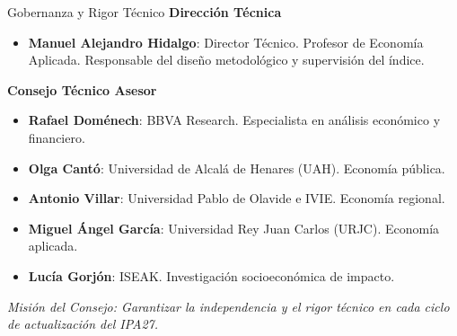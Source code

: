 \documentclass[10pt, aspectratio=169]{beamer}
\begin{document}
\begin{frame}{Gobernanza y Rigor Técnico}
    \textbf{\textcolor{brandgreen}{Dirección Técnica}}
    \begin{itemize}
        \item \textbf{Manuel Alejandro Hidalgo}: Director Técnico. Profesor de Economía Aplicada. Responsable del diseño metodológico y supervisión del índice.
    \end{itemize}
    
    \vspace{0.6cm}
    
    \textbf{\textcolor{brandgreen}{Consejo Técnico Asesor}}
    \begin{itemize}
        \small
        \item \textbf{Rafael Doménech}: BBVA Research. Especialista en análisis económico y financiero.
        \item \textbf{Olga Cantó}: Universidad de Alcalá de Henares (UAH). Economía pública.
        \item \textbf{Antonio Villar}: Universidad Pablo de Olavide e IVIE. Economía regional.
        \item \textbf{Miguel Ángel García}: Universidad Rey Juan Carlos (URJC). Economía aplicada.
        \item \textbf{Lucía Gorjón}: ISEAK. Investigación socioeconómica de impacto.
    \end{itemize}
    
    \vfill
    \centering
    \footnotesize \textit{Misión del Consejo: Garantizar la independencia y el rigor técnico en cada ciclo de actualización del IPA27.}
\end{frame}
\end{document}

